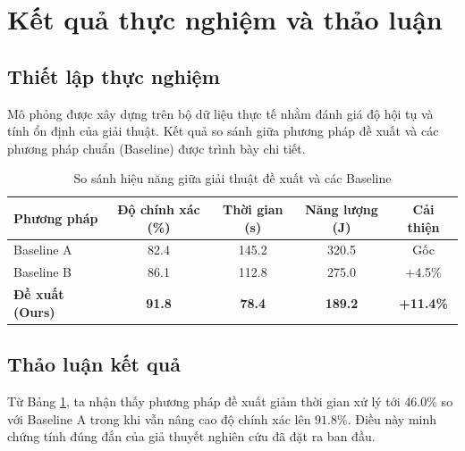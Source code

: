 \section{Kết quả thực nghiệm và thảo luận}
\label{sec:thuc_nghiem}

\subsection{Thiết lập thực nghiệm}
Mô phỏng được xây dựng trên bộ dữ liệu thực tế nhằm đánh giá độ hội tụ và tính ổn định của giải thuật. Kết quả so sánh giữa phương pháp đề xuất và các phương pháp chuẩn (Baseline) được trình bày chi tiết.

\begin{table}[H]
  \centering
  \caption{So sánh hiệu năng giữa giải thuật đề xuất và các Baseline}
  \label{tab:results}
  \begin{tabular}{lcccc}
    \toprule
    \textbf{Phương pháp} & \textbf{Độ chính xác (\%)} & \textbf{Thời gian (s)} & \textbf{Năng lượng (J)} & \textbf{Cải thiện} \\
    \midrule
    Baseline A & 82.4 & 145.2 & 320.5 & Gốc \\
    Baseline B & 86.1 & 112.8 & 275.0 & +4.5\% \\
    \textbf{Đề xuất (Ours)} & \textbf{91.8} & \textbf{78.4} & \textbf{189.2} & \textbf{+11.4\%} \\
    \bottomrule
  \end{tabular}
\end{table}

\subsection{Thảo luận kết quả}
Từ Bảng \ref{tab:results}, ta nhận thấy phương pháp đề xuất giảm thời gian xử lý tới $46.0\%$ so với Baseline A trong khi vẫn nâng cao độ chính xác lên $91.8\%$. Điều này minh chứng tính đúng đắn của giả thuyết nghiên cứu đã đặt ra ban đầu.
